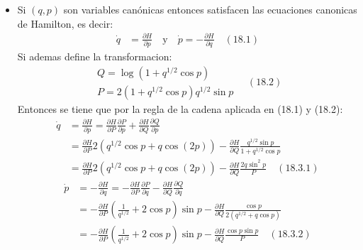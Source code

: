 \documentclass[a4paper]{article}
\begin{document}
    \begin{answer}[Punto 4]
        \begin{itemize}
            \item Si $(q,p)$ son variables canónicas entonces satisfacen las ecuaciones canonicas de Hamilton, es decir:
            \begin{align*}
                \dot q &= \frac{\partial H}{\partial p} \quad \text{y} \quad \dot p = -\frac{\partial H}{\partial q} \quad (18.1)
            \end{align*}
            Si ademas define la transformacion:
            \begin{equation*}
                \begin{gathered}
                    Q=\log \left(1+q^{1 / 2} \cos p\right) \\
                    P=2\left(1+q^{1 / 2} \cos p\right) q^{1 / 2} \sin p
                \end{gathered}    \quad (18.2)
            \end{equation*}
            Entonces se tiene que por la regla de la cadena aplicada en (18.1) y (18.2):
            \begin{align*}
                \dot q &= \frac{\partial H}{\partial p} = \frac{\partial H}{\partial P} \frac{\partial P}{\partial p} + \frac{\partial H}{\partial Q} \frac{\partial Q}{\partial p}\\
                &= \frac{\partial H}{\partial P} 2 \left( q^{1/2} \cos p + q \cos (2p) \right) - \frac{\partial H}{\partial Q} \frac{q^{1/2} \sin p}{1 + q^{1/2} \cos p} \\
                &= \frac{\partial H}{\partial P} 2  \left( q^{1/2} \cos p + q \cos (2p) \right) - \frac{\partial H}{\partial Q} \frac{2q \sin^2 p}{P} \quad (18.3.1)
            \end{align*}
            \begin{align*}
                \dot p &= - \frac {\partial H}{\partial q} = -\frac{\partial H}{\partial P} \frac{\partial P}{\partial q} - \frac{\partial H}{\partial Q} \frac{\partial Q}{\partial q}\\
                &= -\frac{\partial H}{\partial P} \left(\frac1{q^{1/2}} + 2\cos p\right)\sin p - \frac{\partial H}{\partial Q} \frac{\cos p}{2(q^{1/2}  + q \cos p) }\\
                &= -\frac{\partial H}{\partial P} \left(\frac1{q^{1/2}} + 2\cos p\right)\sin p - \frac{\partial H}{\partial Q} \frac{\cos p \sin p}{P} \quad (18.3.2)
            \end{align*}

\end{itemize}
\end{answer}
\end{document}
